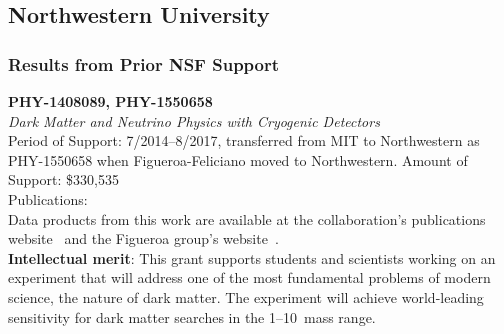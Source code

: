 \subsection{Northwestern University}
\subsubsection{Results from Prior NSF Support}
\label{sec:prev-res}

\vspace{6pt}
\noindent\textbf{PHY-1408089, PHY-1550658}\\ 
\emph{Dark Matter and Neutrino Physics with Cryogenic Detectors}\\
Period of Support: 7/2014--8/2017, transferred from MIT to Northwestern as PHY-1550658 when Figueroa-Feliciano moved to Northwestern. Amount of Support: \$330,535\\
Publications:~\cite{SuperCDMSSensitvitiy:2016arXiv,Agnese:2015nto,OHare2015Readout-strateg,Agnese:2015ywx,Schneck2015Dark-matter-eff,Pyle2015Optimized-Desig,Agnese:2014xye,Agnese:2014vxh,2015PhRvD..91i5023B,Ruppin:2014bra,Agnese:2014aze}\\
Data products from this work are available at the \SuperCDMS collaboration's publications website~\cite{CDMSpubs} and the Figueroa group's website~\cite{FigueroaWeb}.\\








\textbf{Intellectual merit}: This grant supports students and scientists working on an experiment that will address one of the most fundamental problems of modern science, the nature of dark matter. The \scs experiment will achieve world-leading sensitivity for dark matter searches in the 1--10~\gev mass range.


